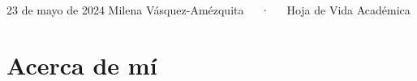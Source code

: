 \documentclass[11pt,a4paper,]{awesome-cv}
\begin{document}
\makecvheader

\makecvfooter
  {23 de mayo de 2024}
    {Milena Vásquez-Amézquita~~~·~~~Hoja de Vida Académica}
  {\thepage}





\hypertarget{acerca-de-muxed}{%
\section{Acerca de mí}\label{acerca-de-muxed}}
\end{document}
